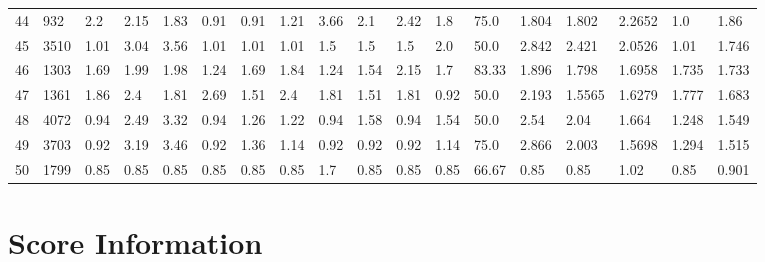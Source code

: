 \documentclass[landscape, 10pt]{report}
\begin{document}
\begin{longtable}{l || l || l | l | l | l | l | l | l | l | l | l | l || l | l | l | l | l}
44 & 932 & 2.2 & 2.15 & 1.83 & 0.91 & 0.91 & 1.21 & 3.66 & 2.1 & 2.42 & 1.8 & 75.0 & 1.804 & 1.802 & 2.2652 & 1.0 & 1.86\\ 
\rowcolor{lightgray}45 & 3510 & 1.01 & 3.04 & 3.56 & 1.01 & 1.01 & 1.01 & 1.5 & 1.5 & 1.5 & 2.0 & 50.0 & 2.842 & 2.421 & 2.0526 & 1.01 & 1.746\\ 
46 & 1303 & 1.69 & 1.99 & 1.98 & 1.24 & 1.69 & 1.84 & 1.24 & 1.54 & 2.15 & 1.7 & 83.33 & 1.896 & 1.798 & 1.6958 & 1.735 & 1.733\\ 
\rowcolor{lightgray}47 & 1361 & 1.86 & 2.4 & 1.81 & 2.69 & 1.51 & 2.4 & 1.81 & 1.51 & 1.81 & 0.92 & 50.0 & 2.193 & 1.5565 & 1.6279 & 1.777 & 1.683\\ 
48 & 4072 & 0.94 & 2.49 & 3.32 & 0.94 & 1.26 & 1.22 & 0.94 & 1.58 & 0.94 & 1.54 & 50.0 & 2.54 & 2.04 & 1.664 & 1.248 & 1.549\\ 
\rowcolor{lightgray}49 & 3703 & 0.92 & 3.19 & 3.46 & 0.92 & 1.36 & 1.14 & 0.92 & 0.92 & 0.92 & 1.14 & 75.0 & 2.866 & 2.003 & 1.5698 & 1.294 & 1.515\\ 
50 & 1799 & 0.85 & 0.85 & 0.85 & 0.85 & 0.85 & 0.85 & 1.7 & 0.85 & 0.85 & 0.85 & 66.67 & 0.85 & 0.85 & 1.02 & 0.85 & 0.901\\ 
\end{longtable} 
 
\pagebreak\pagebreak 
 
 \section*{Score Information} 
\large 
 
\end{document}
